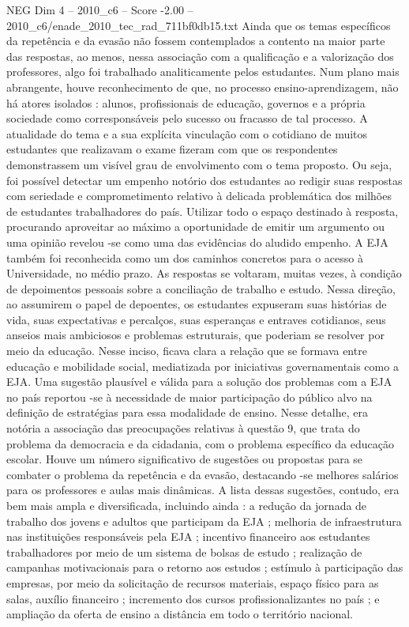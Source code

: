 \begin{textsample}{NEG Dim 4 – 2010\_c6 – Score -2.00 – 2010\_c6/enade\_2010\_tec\_rad\_711bf0db15.txt}
Ainda que os temas específicos da repetência e da evasão não fossem contemplados a contento na maior parte das respostas, ao menos, nessa associação com a qualificação e a valorização dos professores, algo foi trabalhado analiticamente pelos estudantes.
Num plano mais abrangente, houve reconhecimento de que, no processo ensino-aprendizagem, não há atores isolados : alunos, profissionais de educação, governos e a própria sociedade como corresponsáveis pelo sucesso ou fracasso de tal processo.
A atualidade do tema e a sua explícita vinculação com o cotidiano de muitos estudantes que realizavam o exame fizeram com que os respondentes demonstrassem um visível grau de envolvimento com o tema proposto.
Ou seja, foi possível detectar um empenho notório dos estudantes ao redigir suas respostas com seriedade e comprometimento relativo à delicada problemática dos milhões de estudantes trabalhadores do país.
Utilizar todo o espaço destinado à resposta, procurando aproveitar ao máximo a oportunidade de emitir um argumento ou uma opinião revelou -se como uma das evidências do aludido empenho.
A EJA também foi reconhecida como um dos caminhos concretos para o acesso à Universidade, no médio prazo.
As respostas se voltaram, muitas vezes, à condição de depoimentos pessoais sobre a conciliação de trabalho e estudo.
Nessa direção, ao assumirem o papel de depoentes, os estudantes expuseram suas histórias de vida, suas expectativas e percalços, suas esperanças e entraves cotidianos, seus anseios mais ambiciosos e problemas estruturais, que poderiam se resolver por meio da educação.
Nesse inciso, ficava clara a relação que se formava entre educação e mobilidade social, mediatizada por iniciativas governamentais como a EJA.
Uma sugestão plausível e válida para a solução dos problemas com a EJA no país reportou -se à necessidade de maior participação do público alvo na definição de estratégias para essa modalidade de ensino.
Nesse detalhe, era notória a associação das preocupações relativas à questão 9, que trata do problema da democracia e da cidadania, com o problema específico da educação escolar.
Houve um número significativo de sugestões ou propostas para se combater o problema da repetência e da evasão, destacando -se melhores salários para os professores e aulas mais dinâmicas.
A lista dessas sugestões, contudo, era bem mais ampla e diversificada, incluindo ainda : a redução da jornada de trabalho dos jovens e adultos que participam da EJA ; melhoria de infraestrutura nas instituições responsáveis pela EJA ; incentivo financeiro aos estudantes trabalhadores por meio de um sistema de bolsas de estudo ; realização de campanhas motivacionais para o retorno aos estudos ; estímulo à participação das empresas, por meio da solicitação de recursos materiais, espaço físico para as salas, auxílio financeiro ; incremento dos cursos profissionalizantes no país ; e ampliação da oferta de ensino a distância em todo o território nacional.

\end{textsample}

